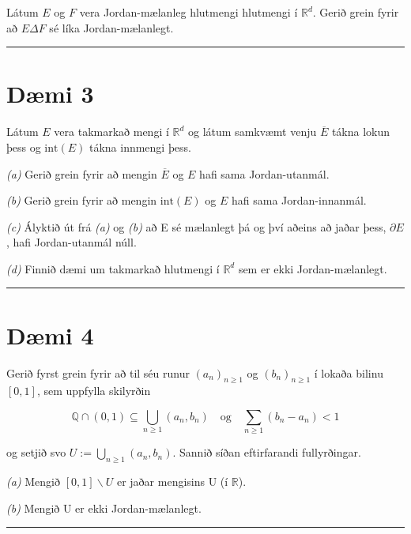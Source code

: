 \documentclass[]{book}
\begin{document}
Látum \(E\) og \(F\) vera Jordan-mælanleg hlutmengi hlutmengi í \(\mathbb R^d\). Gerið grein fyrir að \(E\Delta F\) sé líka Jordan-mælanlegt.

\begin{center}\rule{0.5\linewidth}{\linethickness}\end{center}

\hypertarget{dmi-3-2}{%
\section*{Dæmi 3}\label{dmi-3-2}}

Látum \(E\) vera takmarkað mengi í \(\mathbb R^d\) og látum samkvæmt venju \(\overline E\) tákna lokun þess og \(\text{int}(E)\) tákna innmengi þess.

\emph{(a)} Gerið grein fyrir að mengin \(\overline E\) og \(E\) hafi sama Jordan-utanmál.

\emph{(b)} Gerið grein fyrir að mengin \(\text{int}(E)\) og \(E\) hafi sama Jordan-innanmál.

\emph{(c)} Ályktið út frá \emph{(a)} og \emph{(b)} að E sé mælanlegt þá og því aðeins að jaðar þess, \(\partial E\), hafi Jordan-utanmál núll.

\emph{(d)} Finnið dæmi um takmarkað hlutmengi í \(\mathbb R^d\) sem er ekki Jordan-mælanlegt.

\begin{center}\rule{0.5\linewidth}{\linethickness}\end{center}

\hypertarget{dmi-4-2}{%
\section*{Dæmi 4}\label{dmi-4-2}}

Gerið fyrst grein fyrir að til séu runur \((a_n)_{n\geq 1}\) og \((b_n)_{n\geq1}\) í lokaða bilinu \([0,1]\), sem uppfylla skilyrðin

\[
\mathbb Q \cap (0, 1) \subseteq \bigcup_{n\geq1}(a_n, b_n) \quad \text{og} \quad \sum_{n\geq1}(b_n-a_n)<1
\]

og setjið svo \(U := \bigcup_{n\geq1}(a_n,b_n)\). Sannið síðan eftirfarandi fullyrðingar.

\emph{(a)} Mengið \([0,1]\backslash U\) er jaðar mengisins U (í \(\mathbb R\)).

\emph{(b)} Mengið U er ekki Jordan-mælanlegt.

\begin{center}\rule{0.5\linewidth}{\linethickness}\end{center}
\end{document}

